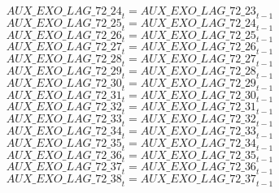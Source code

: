 \begin{dmath}
{AUX\_EXO\_LAG\_72\_24}_{t}={AUX\_EXO\_LAG\_72\_23}_{t-1}
\end{dmath}
\begin{dmath}
{AUX\_EXO\_LAG\_72\_25}_{t}={AUX\_EXO\_LAG\_72\_24}_{t-1}
\end{dmath}
\begin{dmath}
{AUX\_EXO\_LAG\_72\_26}_{t}={AUX\_EXO\_LAG\_72\_25}_{t-1}
\end{dmath}
\begin{dmath}
{AUX\_EXO\_LAG\_72\_27}_{t}={AUX\_EXO\_LAG\_72\_26}_{t-1}
\end{dmath}
\begin{dmath}
{AUX\_EXO\_LAG\_72\_28}_{t}={AUX\_EXO\_LAG\_72\_27}_{t-1}
\end{dmath}
\begin{dmath}
{AUX\_EXO\_LAG\_72\_29}_{t}={AUX\_EXO\_LAG\_72\_28}_{t-1}
\end{dmath}
\begin{dmath}
{AUX\_EXO\_LAG\_72\_30}_{t}={AUX\_EXO\_LAG\_72\_29}_{t-1}
\end{dmath}
\begin{dmath}
{AUX\_EXO\_LAG\_72\_31}_{t}={AUX\_EXO\_LAG\_72\_30}_{t-1}
\end{dmath}
\begin{dmath}
{AUX\_EXO\_LAG\_72\_32}_{t}={AUX\_EXO\_LAG\_72\_31}_{t-1}
\end{dmath}
\begin{dmath}
{AUX\_EXO\_LAG\_72\_33}_{t}={AUX\_EXO\_LAG\_72\_32}_{t-1}
\end{dmath}
\begin{dmath}
{AUX\_EXO\_LAG\_72\_34}_{t}={AUX\_EXO\_LAG\_72\_33}_{t-1}
\end{dmath}
\begin{dmath}
{AUX\_EXO\_LAG\_72\_35}_{t}={AUX\_EXO\_LAG\_72\_34}_{t-1}
\end{dmath}
\begin{dmath}
{AUX\_EXO\_LAG\_72\_36}_{t}={AUX\_EXO\_LAG\_72\_35}_{t-1}
\end{dmath}
\begin{dmath}
{AUX\_EXO\_LAG\_72\_37}_{t}={AUX\_EXO\_LAG\_72\_36}_{t-1}
\end{dmath}
\begin{dmath}
{AUX\_EXO\_LAG\_72\_38}_{t}={AUX\_EXO\_LAG\_72\_37}_{t-1}
\end{dmath}

